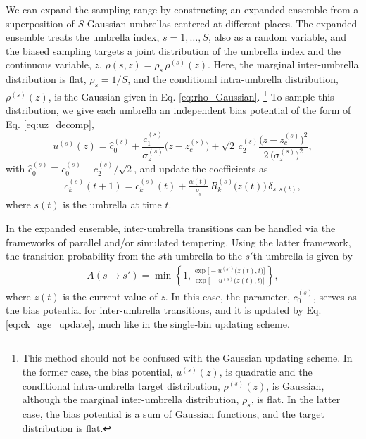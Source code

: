 \documentclass[reprint, superscriptaddress, floatfix]{revtex4-1}
\begin{document}
We can expand the sampling range
by constructing an expanded ensemble
from a superposition of $S$ Gaussian umbrellas
centered at different places.
%
The expanded ensemble treats
the umbrella index, $s = 1, \dots, S$,
also as a random variable,
and the biased sampling targets a joint distribution
of the umbrella index
and the continuous variable, $z$,
$\rho(s, z) = \rho_s \, \rho^{(s)}(z)$.
%
Here,
the marginal inter-umbrella distribution is flat,
$\rho_s = 1/S$,
and the conditional intra-umbrella distribution, $\rho^{(s)}(z)$,
is the Gaussian given in Eq. \eqref{eq:rho_Gaussian}.
\footnote{This method
  should not be confused with the Gaussian updating scheme.
  In the former case, the bias potential, $u^{(s)}(z)$,
  is quadratic
  and the conditional intra-umbrella target distribution, $\rho^{(s)}(z)$,
  is Gaussian,
  although the marginal inter-umbrella distribution, $\rho_s$, is flat.
  In the latter case, the bias potential is a sum of
  Gaussian functions, and the target distribution
  is flat.}
%
To sample this distribution, we give each umbrella
an independent bias potential of the form of Eq. \eqref{eq:uz_decomp},
%
\begin{equation}
  u^{(s)}(z)
  = \hat c_0^{(s)}
  + \frac{c_1^{(s)}}{\sigma_z^{(s)}} \bigl(z - z_c^{(s)}\bigr)
  + \sqrt 2 \, c_2^{(s)} \frac{\bigl(z-z_c^{(s)}\bigr)^2}
  {2 \, \bigl( \sigma_z^{(s)} \bigr)^2}
  ,
  \label{eq:u_age}
\end{equation}
%
with $\hat c_0^{(s)} \equiv c_0^{(s)} - c_2^{(s)}/\sqrt 2$,
and update the coefficients as
%
\begin{align}
  c_k^{(s)}(t+1) = c_k^{(s)}(t)
  + \frac{ \alpha(t) } { \rho_s } \, R_k^{(s)}\bigl( z(t) \bigr) \,
    \delta_{s, s(t)}
  ,
  \label{eq:ck_age_update}
\end{align}
%
where $s(t)$ is the umbrella at time $t$.
%

In the expanded ensemble,
inter-umbrella transitions can be handled via the frameworks of
parallel\cite{swendsen1986,
  *geyer1991, *hukushima1996, *hansmann1997, *sugita1999,
  *earl2005, *zuckerman2011, *rauscher2009,
  neuhaus2006, *neuhaus2007, kim2010}
and/or simulated tempering\cite{marinari1992,
  *lyubartsev1992, li2007,
  park2007, *nguyen2013, *zhang2015st}.
%
Using the latter framework,
the transition probability from
the $s$th umbrella to the $s'$th umbrella is given by
%
\begin{align}
A(s \to s') =
\min\left\{1,
  \frac{
    \exp\bigl[ - u^{(s')}\bigl( z(t), t \bigr) \bigr]
  }
  {
    \exp\bigl[ - u^{(s)}\bigl( z(t), t \bigr) \bigr]
  }
  \right\}
  ,
  \label{eq:transprob_st}
\end{align}
where $z(t)$ is the current value of $z$.
%
In this case,
the parameter, $c_0^{(s)}$,
serves as the bias potential
for inter-umbrella transitions,
and it is updated by Eq. \eqref{eq:ck_age_update},
much like in the single-bin updating scheme.\cite{li2007}
\end{document}

